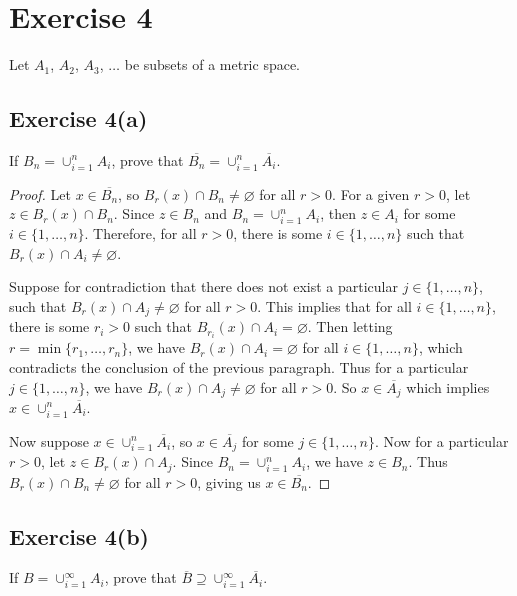 \documentclass[12pt]{article}
\newenvironment{problem}
    {\begin{lrbox}{\mybox}\begin{minipage}{\textwidth-10pt}}
    {\end{minipage}\end{lrbox}\framebox[6.5in]{\usebox{\mybox}}}
\newcommand{\clo}[1]{\overline{#1}}
\let\emptyset\varnothing
\begin{document}
\section*{Exercise 4}
\begin{problem}
    Let $A_1$, $A_2$, $A_3$, $\dots$ be subsets of a metric space. 
\end{problem}

\subsection*{Exercise 4(a)}
\begin{problem}
    If $B_n = \cup _{i=1}^n A_i$, prove that $\overline{B_n} = \cup_{i=1}^n \overline{A_i}$.  
\end{problem}

\begin{proof}
    Let $x\in\clo{B_n}$, so $B_r(x)\cap B_n \ne\emptyset$ for all $r>0$. For a given $r>0$, let $z\in B_r(x)\cap B_n$. Since $z\in B_n$ and $B_n = \cup_{i=1}^n A_i$, then $z\in A_i$ for some $i\in\{1,\dots,n\}$. Therefore, for all $r>0$, there is some $i\in\{1,\dots,n\}$ such that $B_r(x)\cap A_i \ne\emptyset$.
    
    Suppose for contradiction that there does not exist a particular $j\in\{1,\dots,n\}$, such that $B_r(x)\cap A_j \ne\emptyset$ for all $r>0$. This implies that for all $i\in\{1,\dots,n\}$, there is some $r_i>0$ such that $B_{r_i}(x)\cap A_i=\emptyset$. Then letting $r=\min\{r_1,\dots,r_n\}$, we have $B_r(x)\cap A_i = \emptyset$ for all $i\in\{1,\dots,n\}$, which contradicts the conclusion of the previous paragraph. Thus for a particular $j\in\{1,\dots,n\}$, we have $B_r(x)\cap A_j\ne\emptyset$ for all $r>0$. So $x\in\clo{A_j}$ which implies $x\in\cup_{i=1}^n \overline{A_i}$.
    
    Now suppose $x\in\cup_{i=1}^n \overline{A_i}$, so $x\in\clo{A_j}$ for some $j\in\{1,\dots,n\}$. Now for a particular $r>0$, let $z\in B_r(x)\cap A_j$. Since $B_n = \cup_{i=1}^n A_i$, we have $z\in B_n$. Thus $B_r(x)\cap B_n\ne\emptyset$ for all $r>0$, giving us $x\in\clo{B_n}$.
    
\end{proof}

\subsection*{Exercise 4(b)}
\begin{problem}
    If $B = \cup _{i=1}^{\infty} A_i$, prove that $\overline{B} \supseteq \cup_{i=1}^{\infty} \overline{A_i}$.  
\end{problem}
\end{document}
